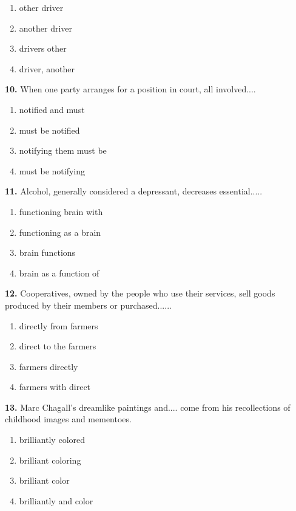 \documentclass[12pt]{article}
\begin{document}
\begin{enumerate}[label=(\Alph*),leftmargin=*,itemsep=0.2em]
\item other driver
\item another driver
\item drivers other
\item driver, another
\end{enumerate}
\par
\vspace{0.25\baselineskip}
\noindent\textbf{10.} When one party arranges for a position in court, all involved....
\begin{enumerate}[label=(\Alph*),leftmargin=*,itemsep=0.2em]
\item notified and must
\item must be notified
\item notifying them must be
\item must be notifying
\end{enumerate}
\par
\vspace{0.25\baselineskip}
\noindent\textbf{11.} Alcohol, generally considered a depressant, decreases essential.....
\begin{enumerate}[label=(\Alph*),leftmargin=*,itemsep=0.2em]
\item functioning brain with
\item functioning as a brain
\item brain functions
\item brain as a function of
\end{enumerate}
\par
\vspace{0.25\baselineskip}
\noindent\textbf{12.} Cooperatives, owned by the people who use their services, sell goods produced by their members or purchased......
\begin{enumerate}[label=(\Alph*),leftmargin=*,itemsep=0.2em]
\item directly from farmers
\item direct to the farmers
\item farmers directly
\item farmers with direct
\end{enumerate}
\par
\vspace{0.25\baselineskip}
\noindent\textbf{13.} Marc Chagall's dreamlike paintings and.... come from his recollections of childhood images and mementoes.
\begin{enumerate}[label=(\Alph*),leftmargin=*,itemsep=0.2em]
\item brilliantly colored
\item brilliant coloring
\item brilliant color
\item brilliantly and color
\end{enumerate}
\end{document}
